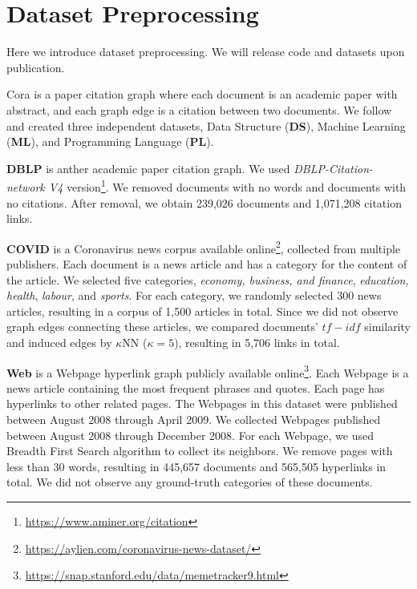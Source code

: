 \section{Dataset Preprocessing}
\label{sec:dataset_preprocessing}

Here we introduce dataset preprocessing. We will release code and datasets upon publication.

Cora \cite{cora} is a paper citation graph where each document is an academic paper with abstract, and each graph edge is a citation between two documents. We follow \cite{cora2} and created three independent datasets, Data Structure (\textbf{DS}), Machine Learning (\textbf{ML}), and Programming Language (\textbf{PL}).

\textbf{DBLP} \cite{aminer} is anther academic paper citation graph. We used \textit{DBLP-Citation-network V4} version\footnote{\url{https://www.aminer.org/citation}}. We removed documents with no words and documents with no citations. After removal, we obtain 239,026 documents and 1,071,208 citation links.

\textbf{COVID} is a Coronavirus news corpus available online\footnote{\url{https://aylien.com/coronavirus-news-dataset/}}, collected from multiple publishers. Each document is a news article and has a category for the content of the article. We selected five categories, \emph{economy, business, and finance}, \emph{education}, \emph{health}, \emph{labour}, and \emph{sports}. For each category, we randomly selected 300 news articles, resulting in a corpus of 1,500 articles in total. Since we did not observe graph edges connecting these articles, we compared documents' $ tf-idf $ similarity and induced edges by $ \kappa $NN ($ \kappa=5 $), resulting in 5,706 links in total.

\textbf{Web} is a Webpage hyperlink graph publicly available online\footnote{\url{https://snap.stanford.edu/data/memetracker9.html}}. Each Webpage is a news article containing the most frequent phrases and quotes. Each page has hyperlinks to other related pages. The Webpages in this dataset were published between August 2008 through April 2009. We collected Webpages published between August 2008 through December 2008. For each Webpage, we used Breadth First Search algorithm to collect its neighbors. We remove pages with less than 30 words, resulting in 445,657 documents and 565,505 hyperlinks in total. We did not observe any ground-truth categories of these documents.